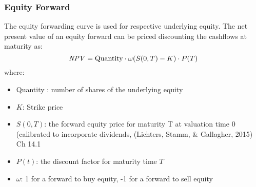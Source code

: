 \subsubsection{Equity Forward}
\label{pricing::eq_forward}

The equity forwarding curve is used for respective underlying equity. The net 
present value of an equity forward can be priced discounting the cashflows at 
maturity as:
$$
\mathit{NPV} = \mbox{Quantity}\cdot\omega (S(0,T)-K)\cdot P(T)
$$
where:
\begin{itemize}
\item Quantity : number of shares of the underlying equity
\item $K$: Strike price
\item $S(0,T)$: the forward equity price for maturity T at valuation time 0 (calibrated to incorporate dividends, (Lichters, Stamm, \& Gallagher, 2015) Ch 14.1
\item $P(t)$: the discount factor for maturity time $T$
\item $\omega$: 1 for a forward to buy equity, -1 for a forward to sell equity 
\end{itemize}
